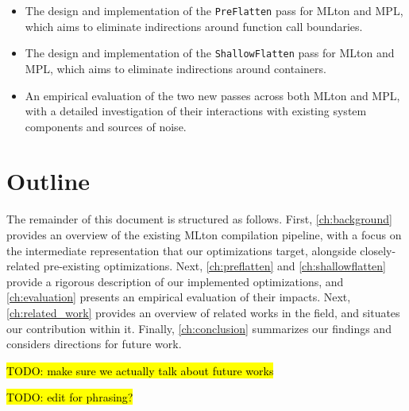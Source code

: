 \begin{itemize}
\item The design and implementation of the \texttt{PreFlatten} pass for MLton and MPL,
which aims to eliminate indirections around function call boundaries.

\item The design and implementation of the \texttt{ShallowFlatten} pass for MLton
and MPL, which aims to eliminate indirections around containers.

\item An empirical evaluation of the two new passes across both MLton and MPL,
with a detailed investigation of their interactions with existing system
components and sources of noise.


\end{itemize}

\section{Outline}

The remainder of this document is structured as follows.
First, \cref{ch:background} provides an overview of the existing MLton
compilation pipeline, with a focus on the intermediate representation that our
optimizations target, alongside closely-related pre-existing optimizations.
Next, \cref{ch:preflatten} and \cref{ch:shallowflatten} provide a rigorous
description of our implemented optimizations, and \cref{ch:evaluation} presents
an empirical evaluation of their impacts. Next, \cref{ch:related_work} provides
an overview of related works in the field, and situates our contribution within
it. Finally, \cref{ch:conclusion} summarizes our findings and considers
directions for future work.


\hl{TODO: make sure we actually talk about future works}


\hl{TODO: edit for phrasing?}


